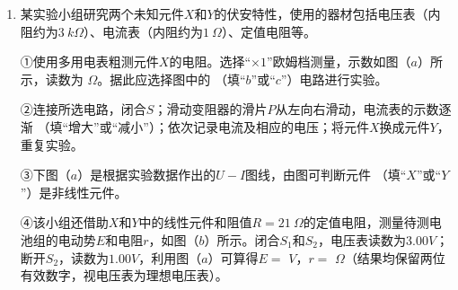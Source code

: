 \begin{enumerate}[leftmargin=0em]
\begin{enumerate}
\end{enumerate}



\newpage

\item
{}
某实验小组研究两个未知元件$ X $和$ Y $的伏安特性，使用的器材包括电压表（内阻约为$ 3 \ k\Omega $）、电流表（内阻约为$ 1 \ \Omega $）、定值电阻等。

①使用多用电表粗测元件$ X $的电阻。选择“$ \times 1 $”欧姆档测量，示数如图（$ a $）所示，读数为  
$ \Omega $。据此应选择图中的  
（填“$ b $”或“$ c $”）电路进行实验。
\begin{figure}[h!]
\centering

\end{figure}

②连接所选电路，闭合$ S $；滑动变阻器的滑片$ P $从左向右滑动，电流表的示数逐渐  
（填“增大”或“减小”）；依次记录电流及相应的电压；将元件$ X $换成元件$ Y $，重复实验。

③下图（$ a $）是根据实验数据作出的$ U-I $图线，由图可判断元件  
（填“$ X $”或“$ Y $”）是非线性元件。
\begin{figure}[h!]
\centering

\end{figure}

④该小组还借助$ X $和$ Y $中的线性元件和阻值$ R=21 \ \Omega $的定值电阻，测量待测电池组的电动势$ E $和电阻$ r $，如图（$ b $）所示。闭合$ S_{1} $和$ S_{2} $，电压表读数为$ 3.00V $；断开$ S_{2} $，读数为$ 1.00V $，利用图（$ a $）可算得$ E= $  
$ V $，$ r= $  
$ \Omega $（结果均保留两位有效数字，视电压表为理想电压表）。



\newpage 







\end{enumerate}

